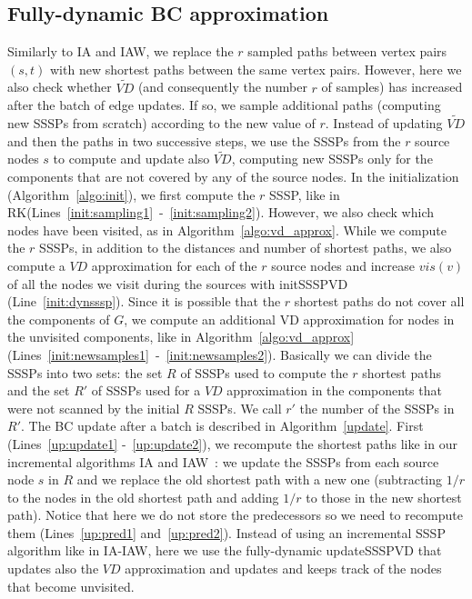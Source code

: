 \documentclass[english]{llncs}
\newcommand{\vd}{$\mathit{VD}$\xspace}
\newcommand{\rk}{\textsf{RK}\xspace}
\begin{document}
\subsection{Fully-dynamic BC approximation} 
\label{sec:fully_dyn_bc}
Similarly to \textsf{IA} and \textsf{IAW}, we replace the $r$ sampled paths between vertex pairs $(s,t)$ with new shortest paths between the same vertex pairs. However, here we also check whether $\tilde{\mathit{VD}}$ (and consequently the number $r$ of samples) has increased after the batch of edge updates. If so, we sample additional paths (computing new SSSPs from scratch) according to the new value of $r$. Instead of updating $\tilde{\mathit{VD}}$ and then the paths in two successive steps, we use the SSSPs from the $r$ source nodes $s$ to compute and update also $\tilde{\mathit{VD}}$, computing new SSSPs only for the components that are not covered by any of the source nodes. In the initialization (Algorithm~\ref{algo:init}), we first compute the $r$ SSSP, like in \rk (Lines~\ref{init:sampling1}~-~\ref{init:sampling2}). However, we also check which nodes have been visited, as in Algorithm~\ref{algo:vd_approx}. While we compute the $r$ SSSPs, in addition to the distances and number of shortest paths, we also compute a \vd approximation for each of the $r$ source nodes and increase $vis(v)$ of all the nodes we visit during the sources with \textsf{initSSSPVD} (Line~\ref{init:dynsssp}). Since it is possible that the $r$ shortest paths do not cover all the components of $G$, we compute an additional VD approximation for nodes in the unvisited components, like in Algorithm~\ref{algo:vd_approx} (Lines~\ref{init:newsamples1}~-~\ref{init:newsamples2}). Basically we can divide the SSSPs into two sets: the set $R$ of SSSPs used to compute the $r$ shortest paths and the set $R'$ of SSSPs used for a \vd approximation in the components that were not scanned by the initial $R$ SSSPs. We call $r'$ the number of the SSSPs in $R'$. The BC update after a batch is described in Algorithm~\ref{update}. First (Lines~\ref{up:update1} -~\ref{up:update2}), we recompute the shortest paths like in our incremental algorithms \textsf{IA} and \textsf{IAW}~\cite{DBLP:conf/alenex/BergaminiMS15}: we update the SSSPs from each source node $s$ in $R$ and we replace the old shortest path with a new one (subtracting $1/r$ to the nodes in the old shortest path and adding $1/r$ to those in the new shortest path). Notice that here we do not store the predecessors so we need to recompute them (Lines~\ref{up:pred1} and~\ref{up:pred2}).
Instead of using an incremental SSSP algorithm like in \textsf{IA}-\textsf{IAW}, here we use the fully-dynamic \textsf{updateSSSPVD} that updates also the \vd approximation and updates and keeps track of the nodes that become unvisited.
\end{document}
